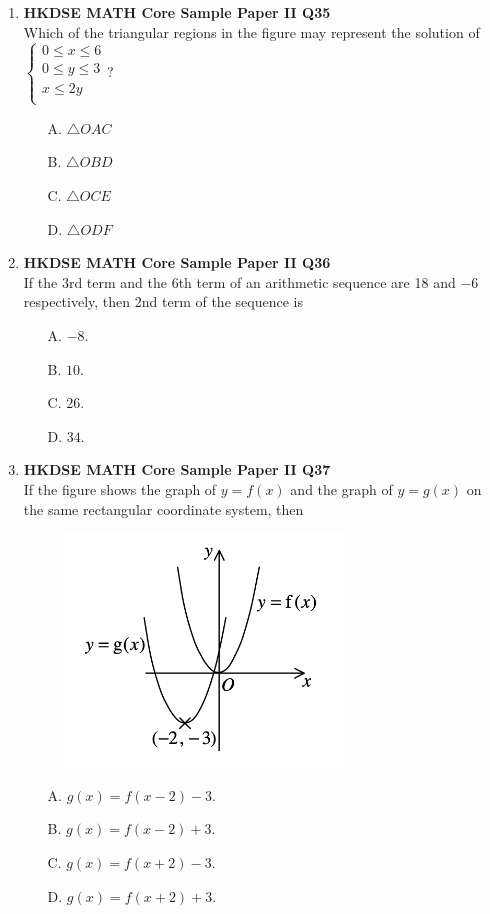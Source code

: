 \documentclass[12pt]{article}
\begin{document}
\begin{enumerate}
	\item \textbf{HKDSE MATH Core Sample Paper II Q35}\\
	Which of the triangular regions in the figure may represent the solution of $\left\{
		\begin{matrix}
			0 \leq x \leq 6\\
			0 \leq y \leq 3\\
			x \leq 2y\\
		\end{matrix}\right.$?
	\begin{enumerate}
		\item[A.] $\triangle OAC$
		\item[B.] $\triangle OBD$
		\item[C.] $\triangle OCE$
		\item[D.] $\triangle ODF$
	\end{enumerate}
	
	\item \textbf{HKDSE MATH Core Sample Paper II Q36}\\
	If the 3rd term and the 6th term of an arithmetic sequence are 18 and $-6$ respectively, then 2nd term of the sequence is
	\begin{enumerate}
		\item[A.] $-8$.
		\item[B.] $10$.
		\item[C.] $26$.
		\item[D.] $34$.
	\end{enumerate}
	
	\item \textbf{HKDSE MATH Core Sample Paper II Q37}\\
	If the figure shows the graph of $y = f(x)$ and the graph of $y = g(x)$ on the same rectangular coordinate system, then
	\begin{figure}[H]
		\centering
		\includegraphics[width = 0.7\textwidth]{SPFigure2.37.png}	
	\end{figure}
	\begin{enumerate}
		\item[A.] $g(x) = f(x - 2) - 3$.
		\item[B.] $g(x) = f(x - 2) + 3$.
		\item[C.] $g(x) = f(x + 2) - 3$.
		\item[D.] $g(x) = f(x + 2) + 3$.
	\end{enumerate}
	

\end{enumerate}
\end{document}
